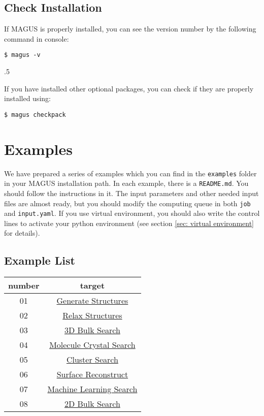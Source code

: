 \documentclass[12pt,oneside]{book}
\newcommand{\file}[1]{\texttt{#1}}
\begin{document}
\section{Check Installation}
If MAGUS is properly installed, you can see the version number by the following command in console:
\begin{tcolorbox}
    \begin{verbatim}
$ magus -v
    \end{verbatim}
.5
\end{tcolorbox}

If you have installed other optional packages, you can check if they are properly installed using:
\begin{tcolorbox}
    \begin{verbatim}
$ magus checkpack
    \end{verbatim}
\end{tcolorbox}

\chapter{Examples}
We have prepared a series of examples which you can find in the \file{examples} folder in your MAGUS installation path. In each example, there is a \file{README.md}. You should follow the instructions in it. The input parameters and other needed input files are almost ready, but you should modify the computing queue in both \file{job} and \file{input.yaml}. If you use virtual environment, you should also write the control lines to activate your python environment (see section \ref{sec: virtual environment} for details).
\section{Example List}
\begin{table}[h]
\centering
\begin{tabular}{c|c}
\hline
number &  target  \\ \hline
01     &  \hyperref[Generate Structures]{Generate Structures}\\
02     &  \hyperref[Relax Structures]{Relax Structures}\\
03     &  \hyperref[3D Bulk Search]{3D Bulk Search}\\
04     &  \hyperref[Molecule Crystal Search]{Molecule Crystal Search}\\
05     &  \hyperref[Cluster Search]{Cluster Search}\\
06     &  \hyperref[Surface Reconstruct]{Surface Reconstruct}\\
07     &  \hyperref[Machine Learning Search]{Machine Learning Search}\\
08     &  \hyperref[2D Bulk Search]{2D Bulk Search}\\ \hline
\end{tabular}
\end{table}
\end{document}
